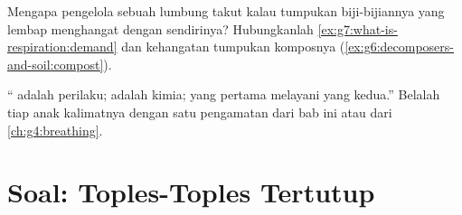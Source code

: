\begin{exercise}[$\star\star$]\label{exo:g7:what-is-respiration:11}
Mengapa pengelola sebuah lumbung takut kalau tumpukan biji-bijiannya
yang lembap menghangat dengan sendirinya? Hubungkanlah
\cref{ex:g7:what-is-respiration:demand} dan kehangatan tumpukan
komposnya
(\cref{ex:g6:decomposers-and-soil:compost}).
\end{exercise}

\begin{exercise}[$\star\star\star$]\label{exo:g7:what-is-respiration:12}
`` adalah perilaku;  adalah kimia; yang pertama
melayani yang kedua.'' Belalah tiap anak kalimatnya dengan satu
pengamatan dari bab ini atau dari
\cref{ch:g4:breathing}.
\end{exercise}

\section{Soal: Toples-Toples Tertutup}

